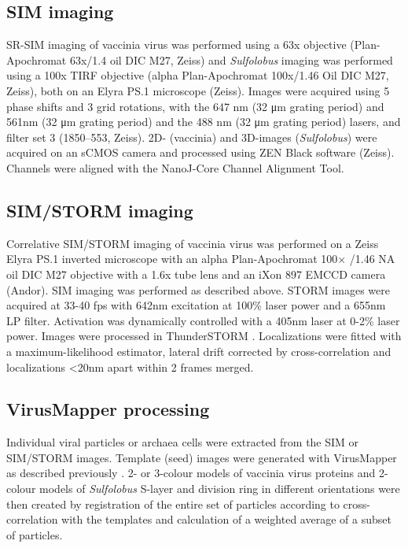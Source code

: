 \subsection{SIM imaging}

SR-SIM imaging of vaccinia virus was performed using a 63x objective (Plan-Apochromat 63x/1.4 oil DIC M27, Zeiss) and \emph{Sulfolobus} imaging was performed using a 100x TIRF objective (alpha Plan-Apochromat 100x/1.46 Oil DIC M27, Zeiss), both on an Elyra PS.1 microscope (Zeiss). Images were acquired using 5 phase shifts and 3 grid rotations, with the 647 nm (32 μm grating period) and 561nm (32 μm grating period) and the 488 nm (32 μm grating period) lasers, and filter set 3 (1850–553, Zeiss). 2D- (vaccinia) and 3D-images (\textit{Sulfolobus}) were acquired on an sCMOS camera and processed using ZEN Black software (Zeiss). Channels were aligned with the NanoJ-Core Channel Alignment Tool.

\subsection{SIM/STORM imaging}

Correlative SIM/STORM imaging of vaccinia virus was performed on a Zeiss Elyra PS.1 inverted microscope with an alpha Plan-Apochromat 100× /1.46 NA oil DIC M27 objective with a 1.6x tube lens and an iXon 897 EMCCD camera (Andor). SIM imaging was performed as described above. STORM images were acquired at 33-40 fps with 642nm excitation at 100\% laser power and a 655nm LP filter. Activation was dynamically controlled with a 405nm laser at 0-2\% laser power. Images were processed in ThunderSTORM \cite{ovesny2014thunderstorm}. Localizations were fitted with a maximum-likelihood estimator, lateral drift corrected by cross-correlation and localizations <20nm apart within 2 frames merged.
 
\subsection{VirusMapper processing}

Individual viral particles or archaea cells were extracted from the SIM or SIM/STORM images. Template (seed) images were generated with VirusMapper as described previously \cite{gray2016virusmapper}. 2- or 3-colour models of vaccinia virus proteins and 2-colour models of \emph{Sulfolobus} S-layer and division ring in different orientations were then created by registration of the entire set of particles according to cross-correlation with the templates and calculation of a weighted average of a subset of particles. 

